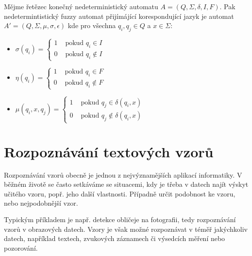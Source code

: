 \documentclass[a4paper,10pt]{article}
\begin{document}
\begin{definition} \label{def-FuzzAutBivAut}
  Mějme řetězec konečný nedeterministický automatu $A = ( Q, \Sigma, \delta, I, F )$. Pak nedetermintistický fuzzy automat přijímájící korespondující jazyk je automat $A' = ( Q, \Sigma, \mu, \sigma, \epsilon )$ kde pro všechna $q_i, q_j \in Q$ a $x \in \Sigma$:
  \begin{itemize}
   \item $\sigma(q_i) =
    \begin{cases}
     1 & \text{ pokud } q_i \in I \\
     0 & \text{ pokud } q_i \notin I
    \end{cases}$
    
   \item $\eta(q_i) =
    \begin{cases}
     1 & \text{ pokud } q_i \in F \\
     0 & \text{ pokud } q_i \notin F
    \end{cases}$
    
    \item $\mu(q_i, x, q_j) = 
     \begin{cases}
      1 & \text{ pokud } q_j \in \delta(q_i, x) \\
      0 & \text{ pokud } q_j \notin \delta(q_i, x)
     \end{cases}$
  \end{itemize}
\end{definition}



\section{Rozpoznávání textových vzorů}

Rozpoznávání vzorů obecně je jednou z nejvýznamějších aplikací informatiky. V běžném životě se často setkáváme se situacemi, kdy je třeba v datech najít výskyt učitého vzoru, popř. jeho další vlastnosti. Případně určit podobnost ke vzoru, nebo nejpodobnější vzor.

Typickým příkladem je např. detekce obličeje na fotografii, tedy rozpoznávání vzorů v obrazových datech. Vzory je však možné rozpoznávat v téměř jakýchkoliv datech, například textech, zvukových záznamech či výsedcích měření nebo pozorování.
\end{document}
